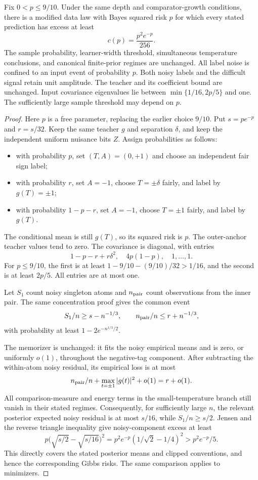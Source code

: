 \begin{corollary}
\label{cor:localized-noise}
Fix $0<p\le9/10$. Under the same depth and comparator-growth conditions, there is a modified data law with Bayes squared risk $p$ for which every stated prediction has excess at least
\[
 c(p)=\frac{p^2e^{-p}}{256}.
\]
The sample probability, learner-width threshold, simultaneous temperature conclusions, and canonical finite-prior regimes are unchanged. All label noise is confined to an input event of probability $p$. Both noisy labels and the difficult signal retain unit amplitude. The teacher and its coefficient bound are unchanged. Input covariance eigenvalues lie between $\min\{1/16,2p/5\}$ and one. The sufficiently large sample threshold may depend on $p$.
\end{corollary}
\begin{proof}
Here $p$ is a free parameter, replacing the earlier choice $9/10$. Put $s=pe^{-p}$ and $r=s/32$. Keep the same teacher $g$ and separation $\delta$, and keep the independent uniform nuisance bits $Z$. Assign probabilities as follows:
\begin{itemize}
\item with probability $p$, set $(T,A)=(0,+1)$ and choose an independent fair sign label;
\item with probability $r$, set $A=-1$, choose $T=\pm\delta$ fairly, and label by $g(T)=\pm1$;
\item with probability $1-p-r$, set $A=-1$, choose $T=\pm1$ fairly, and label by $g(T)$.
\end{itemize}
The conditional mean is still $g(T)$, so its squared risk is $p$. The outer-anchor teacher values tend to zero. The covariance is diagonal, with entries
\[
 1-p-r+r\delta^2,\quad4p(1-p),\quad1,\ldots,1.
\]
For $p\le9/10$, the first is at least $1-9/10-(9/10)/32>1/16$, and the second is at least $2p/5$. All entries are at most one.

Let $S_1$ count noisy singleton atoms and $n_{\rm pair}$ count observations from the inner pair. The same concentration proof gives the common event
\[
 S_1/n\ge s-n^{-1/3},\qquad
 n_{\rm pair}/n\le r+n^{-1/3},
\]
with probability at least $1-2e^{-n^{1/3}/2}$.

The memorizer is unchanged: it fits the noisy empirical means and is zero, or uniformly $o(1)$, throughout the negative-tag component. After subtracting the within-atom noisy residual, its empirical loss is at most
\[
 n_{\rm pair}/n+\max_{t=\pm1}|g(t)|^2+o(1)=r+o(1).
\]
All comparison-measure and energy terms in the small-temperature branch still vanish in their stated regimes. Consequently, for sufficiently large $n$, the relevant posterior expected noisy residual is at most $s/16$, while $S_1/n\ge s/2$. Jensen and the reverse triangle inequality give noisy-component excess at least
\[
 p\bigl(\sqrt{s/2}-\sqrt{s/16}\bigr)^2
 =p^2e^{-p}(1/\sqrt2-1/4)^2>p^2e^{-p}/5.
\]
This directly covers the stated posterior means and clipped conventions, and hence the corresponding Gibbs risks. The same comparison applies to minimizers.


\end{proof}
